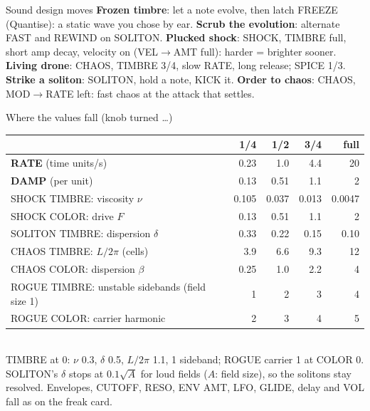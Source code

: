 \documentclass{article}
\newcommand{\FD}[1]{\textcolor{fdc}{#1}}
\newcommand{\EN}[1]{\textcolor{engc}{#1}}
\begin{document}
\begin{minipage}[t]{150mm}
\begin{card}{Sound design moves}
\fontsize{7.4}{9.0}\selectfont
\textbf{Frozen timbre}: let a note evolve, then latch FREEZE (Quantise): a static wave you chose by ear.\quad
\textbf{Scrub the evolution}: alternate FAST and REWIND on SOLITON.\quad
\textbf{Plucked shock}: SHOCK, TIMBRE full, short amp decay, velocity on (VEL\(\to\)AMT full): harder = brighter sooner.\quad
\textbf{Living drone}: CHAOS, TIMBRE 3/4, slow RATE, long release; SPICE 1/3.\quad
\textbf{Strike a soliton}: SOLITON, hold a note, KICK it.\quad
\textbf{Order to chaos}: CHAOS, MOD\(\to\)RATE left: fast chaos at the attack that settles.
\end{card}
\end{minipage}\hfill
\begin{minipage}[t]{128mm}\vspace{0pt}
\begin{card}{Where the values fall (knob turned \dots)}
\fontsize{7.5}{9.2}\selectfont
\setlength{\tabcolsep}{3pt}
\begin{tabular}{@{}l r r r r@{}}
 & 1/4 & 1/2 & 3/4 & full \\ \hline
\FD{\textbf{RATE}} (time units/s) & 0.23 & 1.0 & 4.4 & 20 \\
\FD{\textbf{DAMP}} (per unit) & 0.13 & 0.51 & 1.1 & 2 \\[0.4mm]
\EN{SHOCK} TIMBRE: viscosity \(\nu\) & 0.105 & 0.037 & 0.013 & 0.0047 \\
\EN{SHOCK} COLOR: drive \(F\) & 0.13 & 0.51 & 1.1 & 2 \\
\EN{SOLITON} TIMBRE: dispersion \(\delta\) & 0.33 & 0.22 & 0.15 & 0.10 \\
\EN{CHAOS} TIMBRE: \(L/2\pi\) (cells) & 3.9 & 6.6 & 9.3 & 12 \\
\EN{CHAOS} COLOR: dispersion \(\beta\) & 0.25 & 1.0 & 2.2 & 4 \\
\EN{ROGUE} TIMBRE: unstable sidebands (field size 1) & 1 & 2 & 3 & 4 \\
\EN{ROGUE} COLOR: carrier harmonic & 2 & 3 & 4 & 5 \\
\end{tabular}\\[0.5mm]
TIMBRE at 0: \(\nu\) 0.3, \(\delta\) 0.5, \(L/2\pi\) 1.1, 1 sideband; ROGUE carrier 1 at COLOR 0. SOLITON's \(\delta\) stops at
\(0.1\sqrt{A}\) for loud fields (\(A\): field size), so the solitons stay resolved.
Envelopes, CUTOFF, RESO, ENV AMT, LFO, GLIDE, delay and VOL fall as on the freak card.
\end{card}


\end{minipage}
\end{document}
